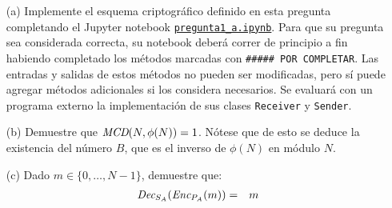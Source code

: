     \begin{enumerate}
\item[(a)] Implemente el esquema criptográfico definido en esta pregunta
  completando el Jupyter notebook
  \href{https://github.com/IIC3253/2023/blob/main/tareas/tarea\%202/enunciado/questions/p1/pregunta1_a.ipynb}{\texttt{pregunta1\_a.ipynb}}. Para
  que su pregunta sea considerada correcta, su notebook deberá correr
  de principio a fin habiendo completado los métodos marcadas con
  \texttt{\#\#\#\#\# POR COMPLETAR}. Las entradas y salidas de estos
  métodos no pueden ser modificadas, pero sí puede agregar métodos
  adicionales si los considera necesarios. Se
  evaluará con un programa externo la implementación de sus clases
  \texttt{Receiver} y \texttt{Sender}.
  
  \item[(b)] Demuestre que $\textit{MCD}(N, \phi(N)) = 1$. Nótese que de esto
    se deduce la existencia del número $B$, que es el inverso
    de $\phi(N)$ en módulo $N$.

\item[(c)] Dado     $m \in \{0, \ldots, N-1\}$, demuestre que:
  \begin{eqnarray*}
    \textit{Dec}_{S_A}(\textit{Enc}_{P_A}(m)) &=& m
  \end{eqnarray*}
  \end{enumerate}


\medskip

